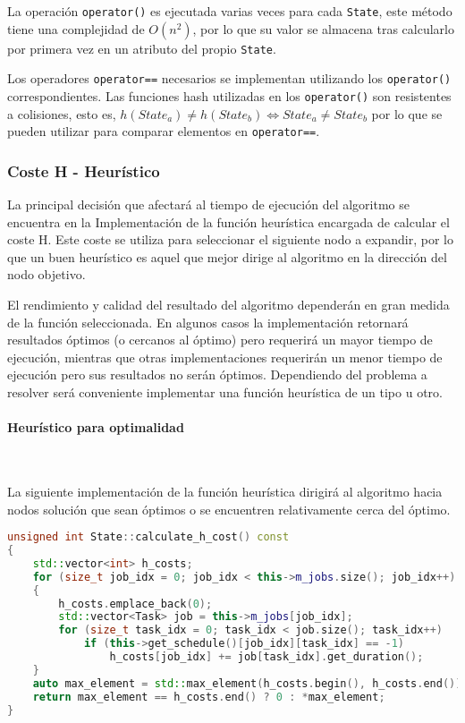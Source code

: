 La operación \lstinline{operator()} es ejecutada varias veces para cada
\lstinline{State}, este método tiene una complejidad de $O(n^2)$,
por lo que su valor se almacena tras calcularlo por primera vez
en un atributo del propio \lstinline{State}.

Los operadores \lstinline{operator==} necesarios se implementan utilizando
los \lstinline{operator()} correspondientes.
Las funciones hash utilizadas en los \lstinline{operator()}
son resistentes a colisiones,
esto es, $
h(State_a) \ne h(State_b) \iff State_a \ne State_b
$
por lo que se pueden
utilizar para comparar elementos en \lstinline{operator==}.

\pagebreak

\label{ssec:Heuristicos}
\subsubsection{Coste H - Heurístico}

La principal decisión que afectará al tiempo de ejecución
del algoritmo se encuentra en la Implementación
de la función heurística encargada de calcular el coste H.
Este coste se utiliza para seleccionar el siguiente nodo
a expandir, por lo que un buen heurístico es aquel que
mejor dirige al algoritmo en la dirección del nodo objetivo.

El rendimiento y calidad del resultado del algoritmo
dependerán en gran medida de la función seleccionada.
En algunos casos la implementación retornará resultados
óptimos (o cercanos al óptimo) pero requerirá un mayor tiempo
de ejecución, mientras que otras implementaciones
requerirán un menor tiempo de ejecución pero sus resultados
no serán óptimos.
Dependiendo del problema a resolver será conveniente implementar
una función heurística de un tipo u otro.

\paragraph{Heurístico para optimalidad}~

La siguiente implementación de la función heurística
dirigirá al algoritmo hacia nodos solución que sean óptimos
o se encuentren relativamente cerca del óptimo.

\begin{lstlisting}[language=C++]
unsigned int State::calculate_h_cost() const
{
    std::vector<int> h_costs;
    for (size_t job_idx = 0; job_idx < this->m_jobs.size(); job_idx++)
    {
        h_costs.emplace_back(0);
        std::vector<Task> job = this->m_jobs[job_idx];
        for (size_t task_idx = 0; task_idx < job.size(); task_idx++)
            if (this->get_schedule()[job_idx][task_idx] == -1)
                h_costs[job_idx] += job[task_idx].get_duration();
    }
    auto max_element = std::max_element(h_costs.begin(), h_costs.end());
    return max_element == h_costs.end() ? 0 : *max_element;
}
\end{lstlisting}

